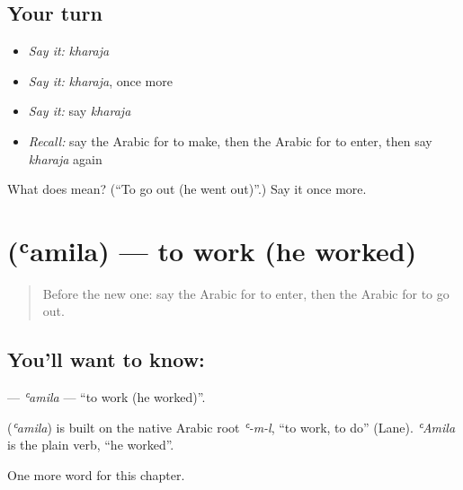 \subsection*{Your turn}
\begin{itemize}
\raggedright
  \item \emph{Say it:} \emph{kharaja}
  \item \emph{Say it:} \emph{kharaja}, once more
  \item \emph{Say it:} say \emph{kharaja}
  \item \emph{Recall:} say the Arabic for to make, then the Arabic for to enter, then say \emph{kharaja} again
\end{itemize}

\begin{tcolorbox}[breakable,colback=teal!4,colframe=teal!35!black,title={Before you move on}]
What does  mean? (\textquotedblleft{}To go out (he went out)\textquotedblright{}.) Say it once more.
\end{tcolorbox}
\section[\texorpdfstring{\ar{عمل} (ʿamila)}{عمل (ʿamila)}]{ (ʿamila) — to work (he worked)}

\label{lesson:AR-C64-amila}



\begin{quote}
Before the new one: say the Arabic for to enter, then the Arabic for to go out.
\end{quote}

\subsection*{You'll want to know: }
\textbf{} — \emph{ʿamila} — \textquotedblleft{}to work (he worked)\textquotedblright{}.

\begin{cousinweb}
\textbf{} (\emph{ʿamila}) is built on the native Arabic root \emph{ʿ-m-l}, \textquotedblleft{}to work, to do\textquotedblright{} (Lane). \emph{ʿAmila} is the plain verb, \textquotedblleft{}he worked\textquotedblright{}.
\end{cousinweb}

\begin{grammarlens}[title={What you've built}]
One more word for this chapter.
\end{grammarlens}

